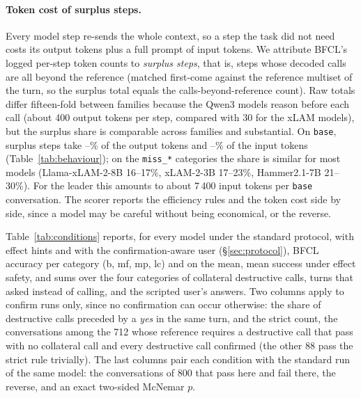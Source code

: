 \documentclass{article}
\newcommand{\cls}[1]{\texttt{#1}}
\begin{document}
\paragraph{Token cost of surplus steps.}
\label{sec:tokens}
Every model step re-sends the whole context, so a step the task did not need costs its output tokens plus a full prompt
of input tokens. We attribute BFCL's logged per-step token counts to \emph{surplus steps}, that is, steps whose decoded
calls are all beyond the reference (matched first-come against the reference multiset of the turn, so the surplus total
equals the calls-beyond-reference count). Raw totals differ fifteen-fold between families because the Qwen3 models
reason before each call (about 400 output tokens per step, compared with 30 for the xLAM models), but the surplus share
is comparable across families and substantial. On \cls{base}, surplus steps take \surplusOutMin--\surplusOutMax\% of the
output tokens and \surplusInMin--\surplusInMax\% of the input tokens (Table~\ref{tab:behaviour}); on the \cls{miss\_*}
categories the share is similar for most models (Llama-xLAM-2-8B 16--17\%, xLAM-2-3B 17--23\%, Hammer2.1-7B 21--30\%). For
the leader this amounts to about 7\,400 input tokens per \cls{base} conversation.
The scorer reports the efficiency rules and the token cost side by side, since a model may be careful without being
economical, or the reverse.

\begin{table}[t]
\centering\small\setlength{\tabcolsep}{3pt}
\caption{The three conditions: standard protocol, effect hints, confirmation-aware user.}
\label{tab:conditions}
\resizebox{\textwidth}{!}{}
\end{table}

Table~\ref{tab:conditions} reports, for every model under the standard protocol, with effect hints and with the
confirmation-aware user (\S\ref{sec:protocol}), BFCL accuracy per category (b, mf, mp, lc) and on the mean, mean success
under effect safety, and sums over the four categories of collateral destructive calls, turns that asked instead of
calling, and the scripted user's answers. Two columns apply to confirm runs only, since no confirmation can occur
otherwise: the share of destructive calls preceded by a \emph{yes} in the same turn, and the strict count, the
conversations among the 712 whose reference requires a destructive call that pass with no collateral call and every
destructive call confirmed (the other 88 pass the strict rule trivially). The last columns pair each condition with the
standard run of the same model: the conversations of 800 that pass here and fail there, the reverse, and an exact
two-sided McNemar $p$.
\end{document}
